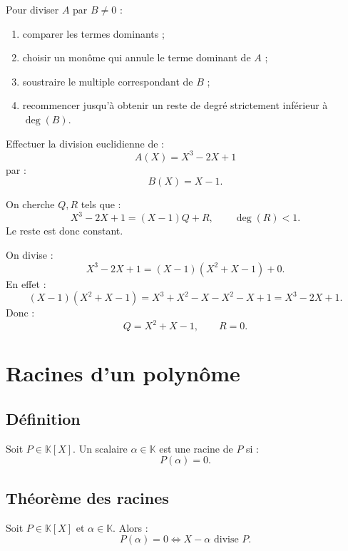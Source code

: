 \documentclass[11pt,a4paper]{article}
\newcommand{\K}{\mathbb K}
\begin{document}
\begin{methodbox}
Pour diviser \(A\) par \(B\neq0\) :
\begin{enumerate}
    \item comparer les termes dominants ;
    \item choisir un monôme qui annule le terme dominant de \(A\) ;
    \item soustraire le multiple correspondant de \(B\) ;
    \item recommencer jusqu'à obtenir un reste de degré strictement inférieur à \(\deg(B)\).
\end{enumerate}
\end{methodbox}

\begin{exercicebox}
Effectuer la division euclidienne de :
\[
A(X)=X^3-2X+1
\]
par :
\[
B(X)=X-1.
\]
\end{exercicebox}

\begin{correctionbox}
On cherche \(Q,R\) tels que :
\[
X^3-2X+1=(X-1)Q+R,
\qquad
\deg(R)<1.
\]
Le reste est donc constant.

On divise :
\[
X^3-2X+1=(X-1)(X^2+X-1)+0.
\]
En effet :
\[
(X-1)(X^2+X-1)=X^3+X^2-X-X^2-X+1=X^3-2X+1.
\]
Donc :
\[
Q=X^2+X-1,
\qquad
R=0.
\]
\end{correctionbox}

\section{Racines d'un polynôme}

\subsection{Définition}

\begin{definitionbox}[Racine]
Soit \(P\in\K[X]\).  
Un scalaire \(\alpha\in\K\) est une racine de \(P\) si :
\[
P(\alpha)=0.
\]
\end{definitionbox}

\subsection{Théorème des racines}

\begin{theorembox}
Soit \(P\in\K[X]\) et \(\alpha\in\K\).  
Alors :
\[
P(\alpha)=0
\Longleftrightarrow
X-\alpha \text{ divise } P.
\]
\end{theorembox}
\end{document}

